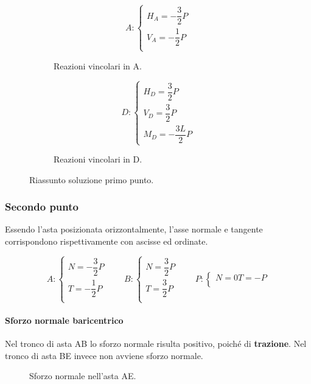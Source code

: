 \documentclass[main.tex]{subfiles}
\begin{document}
\begin{figure}[H]
  \begin{subfigure}[b]{.5\textwidth}
  \centering
  \[
  	A: \begin{cases}
		H_A = - \dfrac{3}{2}P\\
		V_A = - \dfrac{1}{2}P\\
  	\end{cases}
  \]
  \caption{Reazioni vincolari in A.}
  \end{subfigure}
  \hfill
  \begin{subfigure}[b]{.5\textwidth}
  \centering
  \[
  	D: \begin{cases}
  		H_D =  \dfrac{3}{2}P\\
  		V_D =  \dfrac{3}{2}P\\
  		M_D =  -\dfrac{3L}{2}P
  	\end{cases}
  \]
  \caption{Reazioni vincolari in D.}
  \end{subfigure}
  \caption{Riassunto soluzione primo punto.}
\end{figure}

\subsubsection{Secondo punto}
Essendo l'asta posizionata orizzontalmente, l'asse normale e  tangente corrispondono rispettivamente con ascisse ed ordinate.

\[
	A: \begin{cases}
		N = - \dfrac{3}{2}P\\
		T = - \dfrac{1}{2}P\\
	\end{cases}
	\qquad
	B: \begin{cases}
		N =  \dfrac{3}{2}P\\
  		T =  \dfrac{3}{2}P\\
	\end{cases}
	\qquad
	P: \begin{cases}
		N =  0
  		T =  -P\\
	\end{cases}
\]

\paragraph{Sforzo normale baricentrico} Nel tronco di asta AB lo sforzo normale risulta positivo, poiché di \textbf{trazione}. Nel tronco di asta BE invece non avviene sforzo normale.

\begin{figure}[H]
\centering
\resizebox{.5\textwidth}{!}{}
\caption{Sforzo normale nell'asta AE.}
\end{figure}
\end{document}
